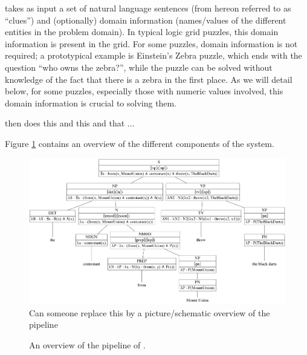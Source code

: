 \ourtool takes as input a set of natural language sentences (from hereon referred to as ``clues'') and (optionally) domain information (names/values of the different entities in the problem domain).
In typical logic grid puzzles, this domain information is present in the grid. 
For some puzzles, domain information is not required; a prototypical example is Einstein's Zebra puzzle, which ends with the question ``who owns the zebra?'', while the puzzle can be solved without knowledge of the fact that there is a zebra in the first place. 
As we will detail below, for some puzzles, especially those with numeric values involved, this domain information is crucial to solving them. 

\ourtool then does this and this and that ... 

Figure \ref{fig:overview} contains an overview of the different components of the system.

\begin{figure}
\centering
\includegraphics[width=\textwidth]{../../poster/graphviz/tree.jpg}
 Can someone replace this by a picture/schematic overview of the pipeline
 \caption{An overview of the pipeline of \ourtool.}
 \label{fig:overview}
\end{figure}


